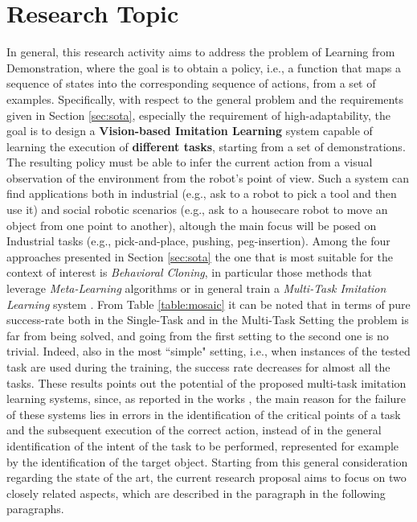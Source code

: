 \section{Research Topic}
\label{sec:research_topic}
In general, this research activity aims to address the problem of Learning from Demonstration, where the goal is to obtain a policy, i.e., a function that maps a sequence of states into the corresponding sequence of actions, from a set of examples. Specifically, with respect to the general problem and the requirements given in Section \ref{sec:sota}, especially the requirement of high-adaptability, the goal is to design a \textbf{Vision-based Imitation Learning} system capable of learning the execution of \textbf{different tasks},  starting from a set of demonstrations. The resulting policy must be able to infer the current action from a visual observation of the environment from the robot's point of view. Such a system can find applications both in industrial (e.g., ask to a robot to pick a tool and then use it) and social robotic scenarios (e.g., ask to a housecare robot to move an object from one point to another), altough the main focus will be posed on Industrial tasks (e.g., pick-and-place, pushing, peg-insertion). 
Among the four approaches presented in Section \ref{sec:sota} the one that is most suitable for the context of interest is \textit{Behavioral Cloning}, in particular those methods that leverage \textit{Meta-Learning} algorithms \cite{finn2017one_shot_visual_il,yu2018one_shot_hil,yu2018daml} or in general train a \textit{Multi-Task Imitation Learning} system \cite{jang2022bc_z,mandi2022towards_more_generalizable_one_shot}. From Table \ref{table:mosaic} it can be noted that in terms of pure success-rate both in the Single-Task and in the Multi-Task Setting the problem is far from being solved, and going from the first setting to the second one is no trivial. Indeed, also in the most ``simple" setting, i.e., when instances of the tested task are used during the training, the success rate decreases for almost all the tasks. These results points out the potential of the proposed multi-task imitation learning systems, since, as reported in the works \cite{jang2022bc_z,yu2018daml}, the main reason for the failure of these systems lies in errors in the identification of the critical points of a task and the subsequent execution of the correct action, instead of in the general identification of the intent of the task to be performed, represented for example by the identification of the target object.
Starting from this general consideration regarding the state of the art, the current research proposal aims to focus on two closely related aspects, which are described in the paragraph in the following paragraphs.
